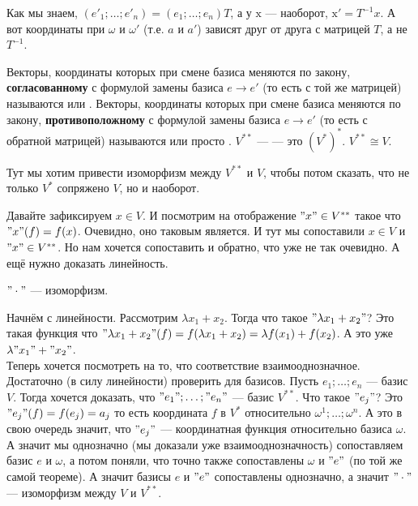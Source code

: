 \documentclass{article}
\begin{document}
\begin{itemize}
\begin{Comment}
$$            $$
        \end{Comment}
        \begin{Comment}
            Как мы знаем, $(e'_1;\ldots;e'_n)=(e_1;\ldots;e_n)T$, а у $\mathrm x$ --- наоборот, $\mathrm x'=T^{-1}x$. А вот координаты при $\omega$ и $\omega'$ (т.е. $a$ и $a'$) зависят друг от друга с матрицей $T$, а не $T^{-1}$.
        \end{Comment}
        \dfn Векторы, координаты которых при смене базиса меняются по закону, \textbf{согласованному} с формулой замены базиса $e\to e'$ (то есть с той же матрицей) называются  или .
        \dfn Векторы, координаты которых при смене базиса меняются по закону, \textbf{противоположному} с формулой замены базиса $e\to e'$ (то есть с обратной матрицей) называются  или просто .
        \dfn $V^{**}$ ---  --- это $({V^*})^*$.
        \thm $V^{**}\cong V$.
        \begin{Comment}
            Тут мы хотим привести изоморфизм между $V^{**}$ и $V$, чтобы потом сказать, что не только $V^*$ сопряжено $V$, но и наоборот.
        \end{Comment}
        \begin{Comment}
            Давайте зафиксируем $x\in V$. И посмотрим на отображение $"x"\in V^{**}$ такое что $"x"(f)=f(x)$. Очевидно, оно таковым является. И тут мы сопоставили $x\in V$ и $"x"\in V^{**}$. Но нам хочется сопоставить и обратно, что уже не так очевидно. А ещё нужно доказать линейность.
        \end{Comment}
        \thm $"\cdot"$ --- изоморфизм.
        \begin{Proof}
            Начнём с линейности. Рассмотрим $\lambda x_1+x_2$. Тогда что такое $"\lambda x_1+x_2"$? Это такая функция что $"\lambda x_1+x_2"(f)=f(\lambda x_1+x_2)=\lambda f(x_1)+f(x_2)$. А это уже $\lambda"x_1"+"x_2"$.\\
            Теперь хочется посмотреть на то, что соответствие взаимооднозначное. Достаточно (в силу линейности) проверить для базисов. Пусть $e_1;\ldots;e_n$ --- базис $V$. Тогда хочется доказать, что $"e_1";\ldots;"e_n"$ --- базис $V^{**}$. Что такое $"e_j"$? Это $"e_j"(f)=f(e_j)=a_j$ то есть координата $f$ в $V^*$ относительно $\omega^1;\ldots;\omega^n$. А это в свою очередь значит, что $"e_j"$ --- координатная функция относительно базиса $\omega$. А значит мы однозначно (мы доказали уже взаимооднозначность) сопоставляем базис $e$ и $\omega$, а потом поняли, что точно также сопоставлены $\omega$ и $"e"$ (по той же самой теореме). А значит базисы $e$ и $"e"$ сопоставлены однозначно, а значит $"\cdot"$ --- изоморфизм между $V$ и $V^{**}$.

\end{Proof}
\end{itemize}
\end{document}
